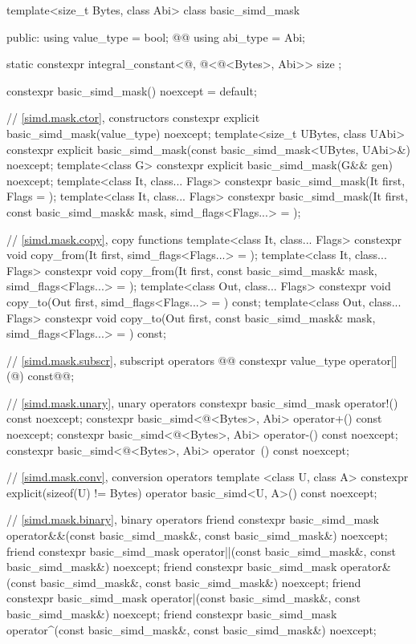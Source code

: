 \begin{codeblock}
template<size_t Bytes, class Abi> class basic_simd_mask {
public:
  using value_type = bool;
  @@
  using abi_type = Abi;

  static constexpr integral_constant<@\simdsizetype@, @\simdsizev@<@\integerfrom@<Bytes>, Abi>> size {};

  constexpr basic_simd_mask() noexcept = default;

  // \ref{simd.mask.ctor},  constructors
  constexpr explicit basic_simd_mask(value_type) noexcept;
  template<size_t UBytes, class UAbi>
    constexpr explicit basic_simd_mask(const basic_simd_mask<UBytes, UAbi>&) noexcept;
  template<class G> constexpr explicit basic_simd_mask(G&& gen) noexcept;
  template<class It, class... Flags>
    constexpr basic_simd_mask(It first, Flags = {});
  template<class It, class... Flags>
    constexpr basic_simd_mask(It first, const basic_simd_mask& mask, simd_flags<Flags...> = {});

  // \ref{simd.mask.copy},  copy functions
  template<class It, class... Flags>
    constexpr void copy_from(It first, simd_flags<Flags...> = {});
  template<class It, class... Flags>
    constexpr void copy_from(It first, const basic_simd_mask& mask, simd_flags<Flags...> = {});
  template<class Out, class... Flags>
    constexpr void copy_to(Out first, simd_flags<Flags...> = {}) const;
  template<class Out, class... Flags>
    constexpr void copy_to(Out first, const basic_simd_mask& mask, simd_flags<Flags...> = {}) const;

  // \ref{simd.mask.subscr},  subscript operators
  @@
  constexpr value_type operator[](@\simdsizetype@) const@\wgRem{\&}@;

  // \ref{simd.mask.unary},  unary operators
  constexpr basic_simd_mask operator!() const noexcept;
  constexpr basic_simd<@\integerfrom@<Bytes>, Abi> operator+() const noexcept;
  constexpr basic_simd<@\integerfrom@<Bytes>, Abi> operator-() const noexcept;
  constexpr basic_simd<@\integerfrom@<Bytes>, Abi> operator~() const noexcept;

  // \ref{simd.mask.conv},  conversion operators
  template <class U, class A>
    constexpr explicit(sizeof(U) != Bytes) operator basic_simd<U, A>() const noexcept;

  // \ref{simd.mask.binary},  binary operators
  friend constexpr basic_simd_mask
    operator&&(const basic_simd_mask&, const basic_simd_mask&) noexcept;
  friend constexpr basic_simd_mask
    operator||(const basic_simd_mask&, const basic_simd_mask&) noexcept;
  friend constexpr basic_simd_mask
    operator&(const basic_simd_mask&, const basic_simd_mask&) noexcept;
  friend constexpr basic_simd_mask
    operator|(const basic_simd_mask&, const basic_simd_mask&) noexcept;
  friend constexpr basic_simd_mask
    operator^(const basic_simd_mask&, const basic_simd_mask&) noexcept;

}
\end{codeblock}

